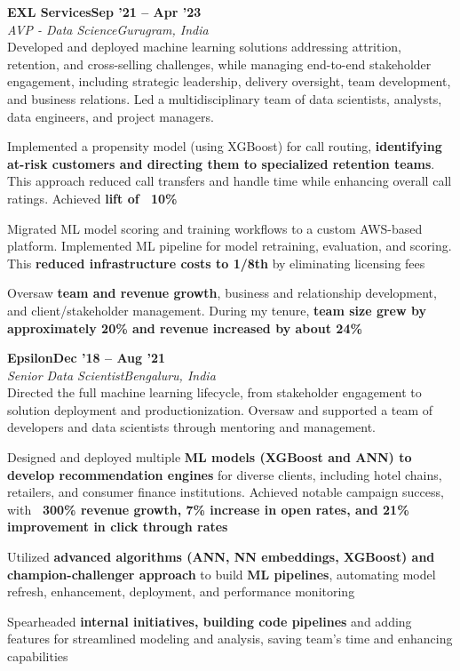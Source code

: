 \documentclass[letterpaper,10pt]{article}
\newcommand{\heading}[2]{
  \hspace{10pt}#1\hfill#2\\
}
\newcommand{\headingBf}[2]{
  \heading{\textbf{#1}}{\textbf{#2}}
}
\newcommand{\headingIt}[2]{
  \heading{\textit{#1}}{\textit{#2}}
}
\newenvironment{resume_list}{
  \vspace{-7pt}
  \begin{itemize}[itemsep=-2px, parsep=1pt, leftmargin=30pt]
}{
  \end{itemize}
}
\begin{document}
  \headingBf{EXL Services}{Sep '21 -- Apr '23}
  \headingIt{AVP - Data Science}{Gurugram, India}
  Developed and deployed machine learning solutions addressing attrition, retention, and cross-selling challenges, while managing end-to-end stakeholder engagement, including strategic leadership, delivery oversight, team development, and business relations. Led a multidisciplinary team of data scientists, analysts, data engineers, and project managers.
  \begin{resume_list}
    \item Implemented a propensity model (using XGBoost) for call routing, \textbf{identifying at-risk customers and directing them to specialized retention teams}. This approach reduced call transfers and handle time while enhancing overall call ratings. Achieved \textbf{lift of ~10\%}
    \item Migrated ML model scoring and training workflows to a custom AWS-based platform. Implemented ML pipeline for model retraining, evaluation, and scoring. This \textbf{reduced infrastructure costs to 1/8th} by eliminating licensing fees
    \item Oversaw \textbf{team and revenue growth}, business and relationship development, and client/stakeholder management. During my tenure, \textbf{team size grew by approximately 20\% and revenue increased by about 24\%}
  \end{resume_list}

  \headingBf{Epsilon}{Dec '18 -- Aug '21}
  \headingIt{Senior Data Scientist}{Bengaluru, India}
  Directed the full machine learning lifecycle, from stakeholder engagement to solution deployment and productionization. Oversaw and supported a team of developers and data scientists through mentoring and management.
  \begin{resume_list}
    \item Designed and deployed multiple \textbf{ML models (XGBoost and ANN) to develop recommendation engines} for diverse clients, including hotel chains, retailers, and consumer finance institutions. Achieved notable campaign success, with \textbf{~300\% revenue growth, 7\% increase in open rates, and 21\% improvement in click through rates}
    \item Utilized \textbf{advanced algorithms (ANN, NN embeddings, XGBoost) and champion-challenger approach} to build \textbf{ML pipelines}, automating model refresh, enhancement, deployment, and performance monitoring
    \item Spearheaded \textbf{internal initiatives, building code pipelines} and adding features for streamlined modeling and analysis, saving team's time and enhancing capabilities
  \end{resume_list}
\end{document}

